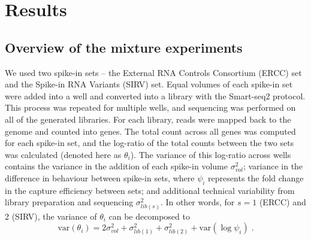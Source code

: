 \documentclass{article}
\begin{document}
% 

\section{Results}

\subsection{Overview of the mixture experiments}
We used two spike-in sets -- the External RNA Controls Consortium (ERCC) set and the Spike-in RNA Variants (SIRV) set.
Equal volumes of each spike-in set were added into a well and converted into a library with the Smart-seq2 protocol.
This process was repeated for multiple wells, and sequencing was performed on all of the generated libraries.
For each library, reads were mapped back to the genome and counted into genes.
The total count across all genes was computed for each spike-in set, and the log-ratio of the total counts between the two sets was calculated (denoted here as $\theta_i$).
The variance of this log-ratio across wells contains the variance in the addition of each spike-in volume $\sigma_{vol}^2$;
    variance in the difference in behaviour between spike-in sets, where $\psi_i$ represents the fold change in the capture efficiency between sets;
    and additional technical variability from library preparation and sequencing $\sigma^2_{lib(s)}$.
In other words, for $s=1$ (ERCC) and 2 (SIRV), the variance of $\theta_i$ can be decomposed to 
\[
    \mbox{var}(\theta_i) = 2\sigma_{vol}^2 + \sigma^2_{lib(1)} + \sigma^2_{lib(2)} + \mbox{var}(\log \psi_i) \;.
\]
\end{document}

